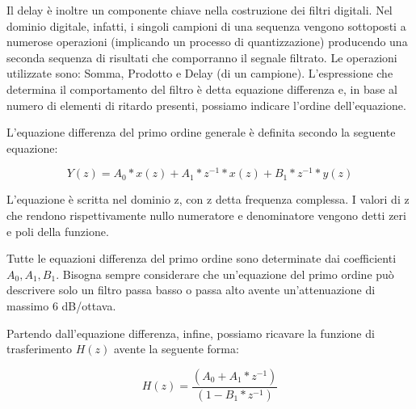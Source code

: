 Il delay è inoltre un componente chiave nella costruzione dei filtri digitali.
Nel dominio digitale, infatti, i singoli campioni di una sequenza vengono sottoposti a numerose operazioni (implicando un processo di quantizzazione) producendo una seconda sequenza di risultati che comporranno il segnale filtrato. 
Le operazioni utilizzate sono: Somma, Prodotto e Delay (di un campione).
L’espressione che determina il comportamento del filtro è detta equazione differenza e, in base al numero di elementi di ritardo presenti, possiamo indicare l’ordine dell’equazione.

L’equazione differenza del primo ordine generale è definita secondo la seguente equazione:

\begin{equation}
Y(z)=A_0*x(z) + A_1*z^{-1}*x(z) + B_1*z^{-1}*y(z)
\end{equation}

L’equazione è scritta nel dominio z, con z detta frequenza complessa.
I valori di z che rendono rispettivamente nullo numeratore e denominatore vengono detti zeri e poli della funzione.

Tutte le equazioni differenza del primo ordine sono determinate dai coefficienti $A_0, A_1,B_1$.
Bisogna sempre considerare che un’equazione del primo ordine può descrivere solo un filtro passa basso o passa alto avente un’attenuazione di massimo 6 dB/ottava.

Partendo dall’equazione differenza, infine, possiamo ricavare la funzione di trasferimento $H(z)$ avente la seguente forma:

\begin{equation}
H(z)=\frac{(A_0 + A_1 * z^{-1})} {(1-B_1 * z^{-1})}
\end{equation}
